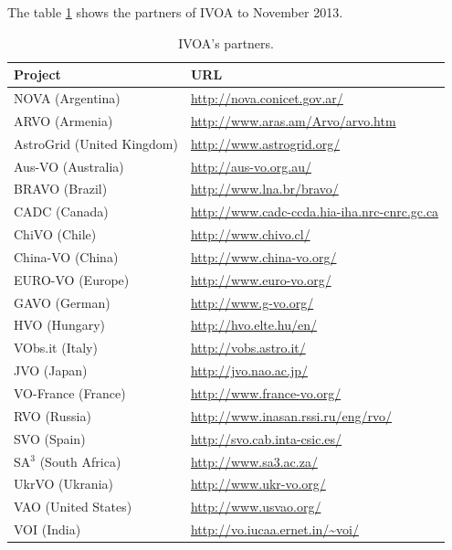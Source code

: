 The table \ref{table:partners} shows the partners of IVOA to
November 2013.\\

\begin{table}%
\centering
\begin{tabular}{|l|l|}
	\hline
	\textbf{Project} & \textbf{URL} \\
	\hline
	NOVA (Argentina) & \url{http://nova.conicet.gov.ar/} \\
	\hline
	ARVO (Armenia) & \url{http://www.aras.am/Arvo/arvo.htm} \\
	\hline
	AstroGrid (United Kingdom) & \url{http://www.astrogrid.org/} \\
	\hline
	Aus-VO (Australia) & \url{http://aus-vo.org.au/} \\
	\hline
	BRAVO (Brazil) & \url{http://www.lna.br/bravo/} \\
	\hline
   CADC (Canada) &
    \url{http://www.cadc-ccda.hia-iha.nrc-cnrc.gc.ca} \\
	\hline
    ChiVO (Chile) & \url{http://www.chivo.cl/} \\
	\hline
    China-VO (China) &
    \url{http://www.china-vo.org/} \\
	\hline
	EURO-VO (Europe) & \url{http://www.euro-vo.org/} \\
	\hline
	GAVO (German) & \url{http://www.g-vo.org/} \\
	\hline
	HVO (Hungary) & \url{http://hvo.elte.hu/en/} \\
	\hline
	VObs.it (Italy) & \url{http://vobs.astro.it/} \\
	\hline
	JVO (Japan) & \url{http://jvo.nao.ac.jp/}\\
	\hline
	VO-France (France) & \url{http://www.france-vo.org/} \\
	\hline
	RVO (Russia) & \url{http://www.inasan.rssi.ru/eng/rvo/} \\
	\hline
	SVO (Spain) & \url{http://svo.cab.inta-csic.es/} \\
	\hline
	SA$^3$ (South Africa) & \url{http://www.sa3.ac.za/} \\
	\hline
	UkrVO (Ukrania) & \url{http://www.ukr-vo.org/} \\
	\hline
	VAO (United States) & \url{http://www.usvao.org/} \\
	\hline
	VOI (India) & \url{http://vo.iucaa.ernet.in/~voi/} \\
	\hline
\end{tabular}
\caption{IVOA's partners.}
\label{table:partners}
\end{table}

